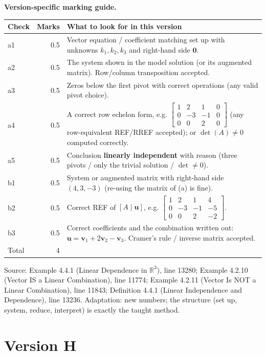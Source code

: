 \documentclass[11pt,a4paper]{article}
\newcommand{\Src}[1]{{\footnotesize\color{black!65}Source: #1}}
\begin{document}
\textbf{Version-specific marking guide.}\par
\begin{tabularx}{\linewidth}{@{}l r >{\raggedright\arraybackslash}X@{}}\toprule Check & Marks & What to look for in this version\\\midrule
a1 & 0.5 & Vector equation / coefficient matching set up with unknowns $k_1,k_2,k_3$ and right-hand side $\mathbf{0}$.\\
a2 & 0.5 & The system shown in the model solution (or its augmented matrix). Row/column transposition accepted.\\
a3 & 0.5 & Zeros below the first pivot with correct operations (any valid pivot choice).\\
a4 & 0.5 & A correct row echelon form, e.g. $\left[\begin{array}{ccc|c} 1 & 2 & 1 & 0 \\ 0 & -3 & -1 & 0 \\ 0 & 0 & 2 & 0 \end{array}\right]$ (any row-equivalent REF/RREF accepted); or $\det(A)\neq0$ computed correctly.\\
a5 & 0.5 & Conclusion \textbf{linearly independent} with reason (three pivots / only the trivial solution / $\det\neq0$).\\
b1 & 0.5 & System or augmented matrix with right-hand side $(4,3,-3)$ (re-using the matrix of (a) is fine).\\
b2 & 0.5 & Correct REF of $[A\mid\mathbf{u}]$, e.g. $\left[\begin{array}{ccc|c} 1 & 2 & 1 & 4 \\ 0 & -3 & -1 & -5 \\ 0 & 0 & 2 & -2 \end{array}\right]$.\\
b3 & 0.5 & Correct coefficients and the combination written out: $\mathbf{u}=\mathbf{v}_1+2\mathbf{v}_2-\mathbf{v}_3$. Cramer's rule / inverse matrix accepted.\\
\midrule Total & 4 & \\\bottomrule\end{tabularx}
\Src{Example 4.4.1 (Linear Dependence in $\mathbb{R}^3$), line 13280; Example 4.2.10 (Vector IS a Linear Combination), line 11774; Example 4.2.11 (Vector Is NOT a Linear Combination), line 11843; Definition 4.4.1 (Linear Independence and Dependence), line 13236. Adaptation: new numbers; the structure (set up, system, reduce, interpret) is exactly the taught method.}\par
\clearpage\section*{Version H}
\end{document}
